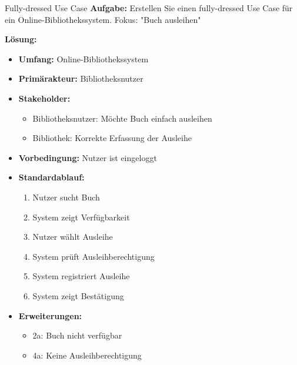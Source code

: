 \begin{example2}{Fully-dressed Use Case}
\textbf{Aufgabe:} Erstellen Sie einen fully-dressed Use Case für ein Online-Bibliothekssystem. Fokus: "Buch ausleihen"

\textbf{Lösung:}
\begin{itemize}
    \item \textbf{Umfang:} Online-Bibliothekssystem
    \item \textbf{Primärakteur:} Bibliotheksnutzer
    \item \textbf{Stakeholder:} 
    \begin{itemize}
        \item Bibliotheksnutzer: Möchte Buch einfach ausleihen
        \item Bibliothek: Korrekte Erfassung der Ausleihe
    \end{itemize}
    \item \textbf{Vorbedingung:} Nutzer ist eingeloggt
    \item \textbf{Standardablauf:}
    \begin{enumerate}
        \item Nutzer sucht Buch
        \item System zeigt Verfügbarkeit
        \item Nutzer wählt Ausleihe
        \item System prüft Ausleihberechtigung
        \item System registriert Ausleihe
        \item System zeigt Bestätigung
    \end{enumerate}
    \item \textbf{Erweiterungen:}
    \begin{itemize}
        \item 2a: Buch nicht verfügbar
        \item 4a: Keine Ausleihberechtigung
    \end{itemize}
\end{itemize}
\end{example2}

